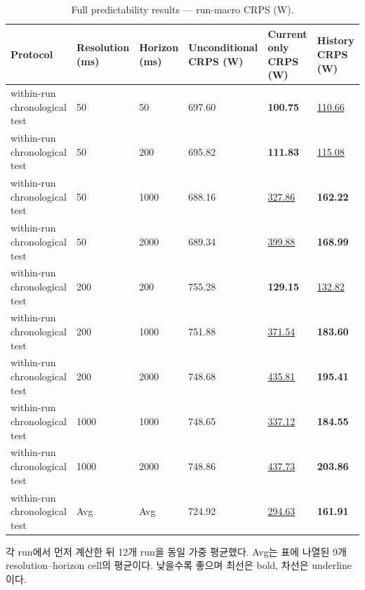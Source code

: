 \begin{table}[t]
\centering
\caption{Full predictability results — run-macro CRPS (W).}
\label{tab:a2a_predictability_crps}
\small
\begin{tabular}{llllll}
\toprule
Protocol & Resolution (ms) & Horizon (ms) & Unconditional CRPS (W) & Current only CRPS (W) & History CRPS (W) \\
\midrule
within-run chronological test & 50 & 50 & 697.60 & \textbf{100.75} & \underline{110.66} \\
within-run chronological test & 50 & 200 & 695.82 & \textbf{111.83} & \underline{115.08} \\
within-run chronological test & 50 & 1000 & 688.16 & \underline{327.86} & \textbf{162.22} \\
within-run chronological test & 50 & 2000 & 689.34 & \underline{399.88} & \textbf{168.99} \\
within-run chronological test & 200 & 200 & 755.28 & \textbf{129.15} & \underline{132.82} \\
within-run chronological test & 200 & 1000 & 751.88 & \underline{371.54} & \textbf{183.60} \\
within-run chronological test & 200 & 2000 & 748.68 & \underline{435.81} & \textbf{195.41} \\
within-run chronological test & 1000 & 1000 & 748.65 & \underline{337.12} & \textbf{184.55} \\
within-run chronological test & 1000 & 2000 & 748.86 & \underline{437.73} & \textbf{203.86} \\
within-run chronological test & Avg & Avg & 724.92 & \underline{294.63} & \textbf{161.91} \\
\bottomrule
\end{tabular}
\vspace{2pt}\par\footnotesize 각 run에서 먼저 계산한 뒤 12개 run을 동일 가중 평균했다. Avg는 표에 나열된 9개 resolution–horizon cell의 평균이다. 낮을수록 좋으며 최선은 bold, 차선은 underline이다.
\end{table}
